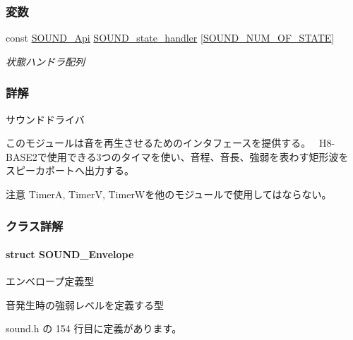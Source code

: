 \subsubsection*{変数}
\begin{DoxyCompactItemize}
\item 
const \hyperlink{sound_8h_a25ea542ecfc47a97aed27c42ee791f3f_a25ea542ecfc47a97aed27c42ee791f3f}{S\+O\+U\+N\+D\+\_\+\+Api} \hyperlink{sound_8h_acf4c0032eb66261be38af2018b4119d3_acf4c0032eb66261be38af2018b4119d3}{S\+O\+U\+N\+D\+\_\+state\+\_\+handler} \mbox{[}\hyperlink{sound_8h_abb21e5244ee60939e8a32ec932e9d7b3_abb21e5244ee60939e8a32ec932e9d7b3ac0294a814acb2bcb5d3c4cefef53a22c}{S\+O\+U\+N\+D\+\_\+\+N\+U\+M\+\_\+\+O\+F\+\_\+\+S\+T\+A\+T\+E}\mbox{]}
\begin{DoxyCompactList}\small\item\em 状態ハンドラ配列 \end{DoxyCompactList}\end{DoxyCompactItemize}


\subsubsection{詳解}
サウンドドライバ 

このモジュールは音を再生させるためのインタフェースを提供する。~\newline
H8-\/\+B\+A\+S\+E2で使用できる3つのタイマを使い、音程、音長、強弱を表わす矩形波を スピーカポートへ出力する。

\begin{DoxyAttention}{注意}
Timer\+A, Timer\+V, Timer\+Wを他のモジュールで使用してはならない。
\end{DoxyAttention}
 

\subsubsection{クラス詳解}
\label{structSOUND__Envelope}
\paragraph{struct S\+O\+U\+N\+D\+\_\+\+Envelope}
エンベロープ定義型 

音発生時の強弱レベルを定義する型 

 sound.\+h の 154 行目に定義があります。



